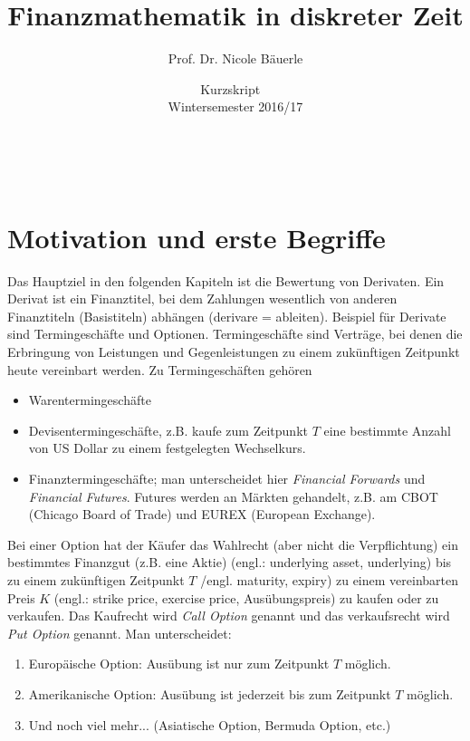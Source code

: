 \documentclass[12pt]{extreport} %
\title{Finanzmathematik in diskreter Zeit}
\author{Prof. Dr. Nicole Bäuerle}
\date{Kurzskript ~\vspace{0.2cm} \\ Wintersemester 2016/17}
\makeatletter
\theoremstyle{named}
\theoremstyle{itshape}
\theoremstyle{normal}
\def\maketitle{ \begin{titlepage} 
			~\vspace{3cm} 
		\begin{center} {\Huge \@title} \end{center} 
	 		\vspace*{1cm} 
	 	\begin{center} {\large \@author} \end{center} 
	 	\begin{center} \@date \end{center} 
	 		\vspace*{7cm} 
	 	\begin{center} \@publishers \end{center} 
	 		\vfill 
	\end{titlepage} }
\makeatother
\begin{document}
\begin{titlepage}
	\maketitle
	\thispagestyle{empty}
\end{titlepage}
	
\tableofcontents
\thispagestyle{empty} 
  
\chapter{Motivation und erste Begriffe}

Das Hauptziel in den folgenden Kapiteln ist die Bewertung von Derivaten. Ein Derivat ist ein Finanztitel, bei dem Zahlungen wesentlich von anderen Finanztiteln (Basistiteln) abhängen (derivare = ableiten). Beispiel für Derivate sind Termingeschäfte und Optionen. Termingeschäfte sind Verträge, bei denen die Erbringung von Leistungen und Gegenleistungen zu einem zukünftigen Zeitpunkt heute vereinbart werden. Zu Termingeschäften gehören
\begin{itemize}
	\item Warentermingeschäfte
	\item Devisentermingeschäfte, z.B. kaufe zum Zeitpunkt $T$ eine bestimmte Anzahl von US Dollar zu einem festgelegten Wechselkurs.
	\item Finanztermingeschäfte; man unterscheidet hier \textit{Financial Forwards} und \textit{Financial Futures}. Futures werden an Märkten gehandelt, z.B. am CBOT (Chicago Board of Trade) und EUREX (European Exchange).
\end{itemize}

Bei einer Option hat der Käufer das Wahlrecht (aber nicht die Verpflichtung) ein bestimmtes Finanzgut (z.B. eine Aktie) (engl.: underlying asset, underlying) bis zu einem zukünftigen Zeitpunkt $T$ /engl. maturity, expiry) zu einem vereinbarten Preis $K$ (engl.: strike price, exercise price, Ausübungspreis) zu kaufen oder zu verkaufen. Das Kaufrecht wird \textit{Call Option} genannt und das verkaufsrecht wird \textit{Put Option} genannt. Man unterscheidet:
\begin{enumerate}
	\item Europäische Option: Ausübung ist nur zum Zeitpunkt $T$ möglich.
	\item Amerikanische Option: Ausübung ist jederzeit bis zum Zeitpunkt $T$ möglich.
	\item Und noch viel mehr... (Asiatische Option, Bermuda Option, etc.)
\end{enumerate} 

\printindex
\end{document}
